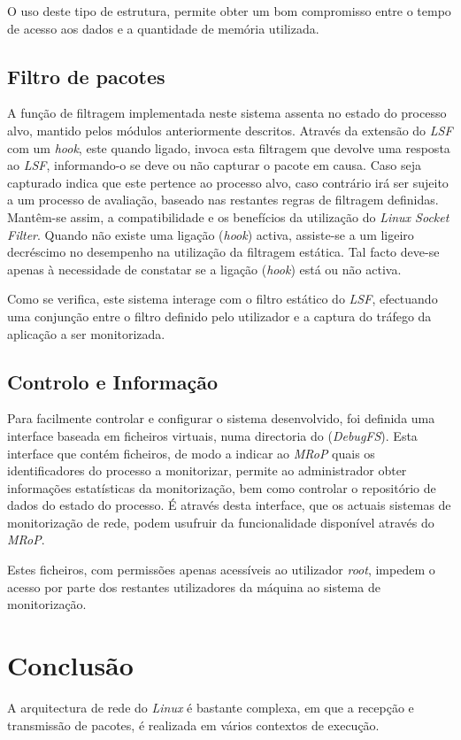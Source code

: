 O uso deste tipo de estrutura, permite obter um bom compromisso entre o tempo de acesso aos dados e a quantidade de memória utilizada.

\subsection{Filtro de pacotes}
\label{sub:packet_filter}

A função de filtragem implementada neste sistema assenta no estado do processo alvo, mantido pelos módulos anteriormente descritos.
Através da extensão do \textit{LSF} com um \textit{hook}, este quando ligado, invoca esta filtragem que devolve uma resposta ao \textit{LSF}, informando-o se deve ou não capturar o pacote em causa.
Caso seja capturado indica que este pertence ao processo alvo, caso contrário irá ser sujeito a um processo de avaliação, baseado nas restantes regras de filtragem definidas.
Mantêm-se assim, a compatibilidade e os benefícios da utilização do \textit{Linux Socket Filter}.
Quando não existe uma ligação (\textit{hook}) activa, assiste-se a um ligeiro decréscimo no desempenho na utilização da filtragem estática.
Tal facto deve-se apenas à necessidade de constatar se a ligação (\textit{hook}) está ou não activa.

Como se verifica, este sistema interage com o filtro estático do \textit{LSF}, efectuando uma conjunção entre o filtro definido pelo utilizador e a captura do tráfego da aplicação a ser monitorizada.

\subsection{Controlo e Informação}
\label{sub:data_information}

Para facilmente controlar e configurar o sistema desenvolvido, foi definida uma interface baseada em ficheiros virtuais, numa directoria do (\textit{DebugFS}).
Esta interface que contém ficheiros, de modo a indicar ao \textit{MRoP} quais os identificadores do processo a monitorizar, permite ao administrador obter informações estatísticas da monitorização, bem como controlar o repositório de dados do estado do processo.
É através desta interface, que os actuais sistemas de monitorização de rede, podem usufruir da funcionalidade disponível através do \textit{MRoP}.

Estes ficheiros, com permissões apenas acessíveis ao utilizador \textit{root}, impedem o acesso por parte dos restantes utilizadores da máquina ao sistema de monitorização.

\section{Conclusão}

A arquitectura de rede do \textit{Linux} é bastante complexa, em que a recepção e transmissão de pacotes, é realizada em vários contextos de execução.
